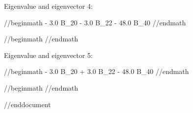 Eigenvalue and eigenvector 4:

//begin{math}
- 3.0 B_{20} - 3.0 B_{22} - 48.0 B_{40}
//end{math}

//begin{math}
\left[\begin{matrix}0\\-1.0\\0\\1.0\\0\end{matrix}\right]
//end{math}

Eigenvalue and eigenvector 5:

//begin{math}
- 3.0 B_{20} + 3.0 B_{22} - 48.0 B_{40}
//end{math}

//begin{math}
\left[\begin{matrix}0\\1.0\\0\\1.0\\0\end{matrix}\right]
//end{math}


//end{document}
